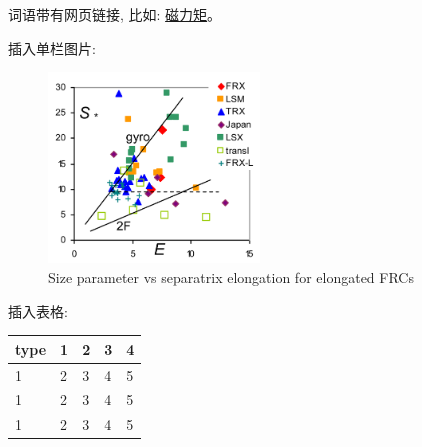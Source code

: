 词语带有网页链接, 比如: \href{https://zh.wikipedia.org/wiki/%E7%A3%81%E7%9F%A9}{磁力矩}。


插入单栏图片: 
\begin{figure}[!hbtp]
    \centering
    \includegraphics[width=0.5\textwidth]{figs/ctilt.png} 
    \caption{Size parameter vs separatrix elongation for elongated FRCs\cite{steinhauer2011review}}
    \label{fig: cgyro}
\end{figure}

插入表格: 
\begin{table}[!hbtp]
    \centering
    \begin{tabular}{lllll}
    \hline
    type & 1 & 2 & 3 & 4 \\ \hline
    1    & 2 & 3 & 4 & 5 \\ \hline
    1    & 2 & 3 & 4 & 5 \\ \hline
    1    & 2 & 3 & 4 & 5 \\ \hline
    \end{tabular}
\end{table}


